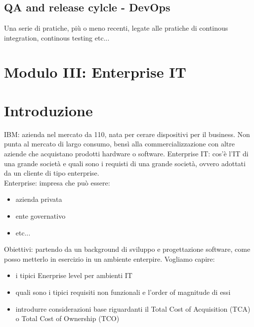 \documentclass{article}
\begin{document}
\subsection{QA and release cylcle - DevOps}
Una serie di pratiche, più o meno recenti, legate alle pratiche di continous integration, continous testing etc...

\newpage
\section{Modulo III: Enterprise IT}
\section{Introduzione}
IBM: azienda nel mercato da 110, nata per cerare dispositivi per il business. Non punta al mercato di largo consumo, bensì alla commercializzazione con altre aziende che acquistano prodotti hardware o software. Enterprise IT: cos'è l'IT di una grande società e quali sono i requisti di una grande società, ovvero adottati da un cliente di tipo enterprise.\\ Enterprise: impresa che può essere:
\begin{itemize}
\item azienda privata
\item ente governativo
\item etc...
\end{itemize}
Obiettivi: partendo da un background di sviluppo e progettazione software, come posso metterlo in esercizio in un ambiente enterpire. Vogliamo capire:
\begin{itemize}
\item i tipici Enerprise level per ambienti IT
\item quali sono i tipici requisiti non funzionali e l'order of magnitude di essi
\item introdurre considerazioni base riguardanti il Total Cost of Acquisition (TCA) o Total Cost of Ownership (TCO)
\end{itemize}
\end{document}
